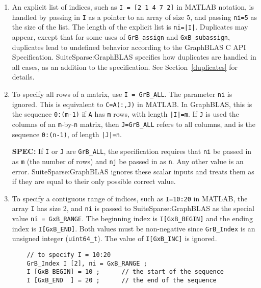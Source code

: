 \documentclass[12pt]{article}
\begin{document}
\begin{enumerate}
\item
    An explicit list of indices, such as \verb'I = [2 1 4 7 2]' in MATLAB
    notation, is handled by passing in \verb'I' as a pointer to an array of
    size 5, and passing \verb'ni=5' as the size of the list.
    The length of the explicit list is \verb'ni=|I|'.
    Duplicates may appear, except that for some uses of \verb'GrB_assign'
    and \verb'GxB_subassign', duplicates lead to undefined behavior
    according to the GraphBLAS C API Specification.
    SuiteSparse:GraphBLAS specifies how duplicates are handled in all cases,
    as an addition to the specification.
    See Section~\ref{duplicates} for details.

\item To specify all rows of a matrix, use \verb'I = GrB_ALL'.  The
    parameter \verb'ni' is ignored.  This is equivalent to \verb'C=A(:,J)'
    in MATLAB.  In GraphBLAS, this is the sequence \verb'0:(m-1)' if \verb'A'
    has \verb'm' rows, with length \verb'|I|=m'.  If \verb'J' is used the
    columns of an \verb'm'-by-\verb'n' matrix, then \verb'J=GrB_ALL' refers to
    all columns, and is the sequence \verb'0:(n-1)', of length \verb'|J|=n'.

    \begin{alert}
    {\bf SPEC:} If \verb'I' or \verb'J' are \verb'GrB_ALL', the specification
    requires that \verb'ni' be passed in as \verb'm' (the number of rows)
    and \verb'nj' be passed in as \verb'n'.  Any other value is an error.
    SuiteSparse:GraphBLAS ignores these scalar inputs and treats them as if
    they are equal to their only possible correct value.
    \end{alert}

\item To specify a contiguous range of indices, such as \verb'I=10:20'
    in MATLAB, the array \verb'I' has size 2, and \verb'ni' is passed to
    SuiteSparse:GraphBLAS as the special value \verb'ni = GxB_RANGE'.  The
    beginning index is \verb'I[GxB_BEGIN]' and the ending index is
    \verb'I[GxB_END]'.   Both values must be non-negative since
    \verb'GrB_Index' is an unsigned integer (\verb'uint64_t').  The value of
    \verb'I[GxB_INC]' is ignored.

    \vspace{-0.05in}
    {\footnotesize
    \begin{verbatim}
    // to specify I = 10:20
    GrB_Index I [2], ni = GxB_RANGE ;
    I [GxB_BEGIN] = 10 ;      // the start of the sequence
    I [GxB_END  ] = 20 ;      // the end of the sequence \end{verbatim}}


\end{enumerate}
\end{document}
